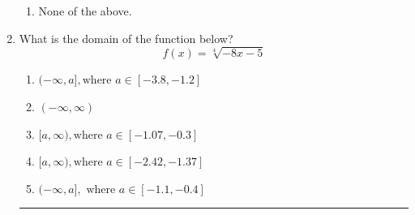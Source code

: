 \documentclass[14pt]{extbook}
\newcommand{\litem}[1]{\item#1\hspace*{-1cm}\rule{\textwidth}{0.4pt}}
\begin{document}
\begin{enumerate}
{\begin{enumerate}[label=\Alph*.]
\item None of the above.
\end{enumerate} }
\litem{
What is the domain of the function below?\[ f(x) = \sqrt[4]{-8 x - 5} \]\begin{enumerate}[label=\Alph*.]
\item \( (-\infty, a], \text{where } a \in [-3.8, -1.2] \)
\item \( (-\infty, \infty) \)
\item \( [a, \infty), \text{where } a \in [-1.07, -0.3] \)
\item \( [a, \infty), \text{where } a \in [-2.42, -1.37] \)
\item \( (-\infty, a], \text{ where } a \in [-1.1, -0.4] \)


\end{enumerate}}
\end{enumerate}
\end{document}
